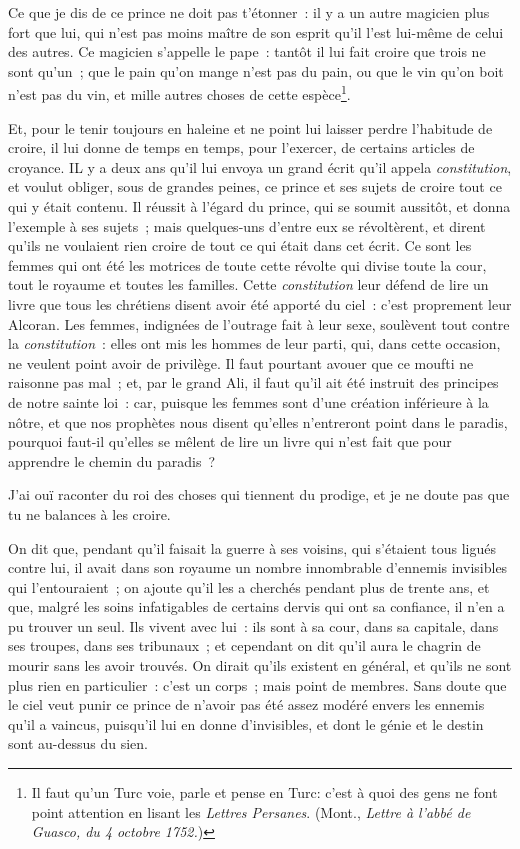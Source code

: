 \documentclass[french,twoside]{book} %
\begin{document}
Ce que je dis de ce prince ne doit pas t’étonner : il y a un autre magicien plus fort que lui, qui n’est pas moins maître de son esprit qu’il l’est lui-même de celui des autres. Ce magicien s’appelle le pape : tantôt il lui fait croire que trois ne sont qu’un ; que le pain qu’on mange n’est pas du pain, ou que le vin qu’on boit n’est pas du vin, et mille autres choses de cette espèce\footnote{Il faut qu’un Turc voie, parle et pense en Turc: c’est à quoi des gens ne font point attention en lisant les {\itshape Lettres Persanes}. (Mont., {\itshape Lettre à l’abbé de Guasco, du 4 octobre 1752.})}.\par
Et, pour le tenir toujours en haleine et ne point lui laisser perdre l’habitude de croire, il lui donne de temps en temps, pour l’exercer, de certains articles de croyance. IL y a deux ans qu’il lui envoya un grand écrit qu’il appela {\itshape constitution}, et voulut obliger, sous de grandes peines, ce prince et ses sujets de croire tout ce qui y était contenu. Il réussit à l’égard du prince, qui se soumit aussitôt, et donna l’exemple à ses sujets ; mais quelques-uns d’entre eux se révoltèrent, et dirent qu’ils ne voulaient rien croire de tout ce qui était dans cet écrit. Ce sont les femmes qui ont été les motrices de toute cette révolte qui divise toute la cour, tout le royaume et toutes les familles. Cette {\itshape constitution} leur défend de lire un livre que tous les chrétiens disent avoir été apporté du ciel : c’est proprement leur Alcoran. Les femmes, indignées de l’outrage fait à leur sexe, soulèvent tout contre la {\itshape constitution} : elles ont mis les hommes de leur parti, qui, dans cette occasion, ne veulent point avoir de privilège. Il faut pourtant avouer que ce moufti ne raisonne pas mal ; et, par le grand Ali, il faut qu’il ait été instruit des principes de notre sainte loi : car, puisque les femmes sont d’une création inférieure à la nôtre, et que nos prophètes nous disent qu’elles n’entreront point dans le paradis, pourquoi faut-il qu’elles se mêlent de lire un livre qui n’est fait que pour apprendre le chemin du paradis ?\par
J’ai ouï raconter du roi des choses qui tiennent du prodige, et je ne doute pas que tu ne balances à les croire.\par
On dit que, pendant qu’il faisait la guerre à ses voisins, qui s’étaient tous ligués contre lui, il avait dans son royaume un nombre innombrable d’ennemis invisibles qui l’entouraient ; on ajoute qu’il les a cherchés pendant plus de trente ans, et que, malgré les soins infatigables de certains dervis qui ont sa confiance, il n’en a pu trouver un seul. Ils vivent avec lui : ils sont à sa cour, dans sa capitale, dans ses troupes, dans ses tribunaux ; et cependant on dit qu’il aura le chagrin de mourir sans les avoir trouvés. On dirait qu’ils existent en général, et qu’ils ne sont plus rien en particulier : c’est un corps ; mais point de membres. Sans doute que le ciel veut punir ce prince de n’avoir pas été assez modéré envers les ennemis qu’il a vaincus, puisqu’il lui en donne d’invisibles, et dont le génie et le destin sont au-dessus du sien.\par
\end{document}

